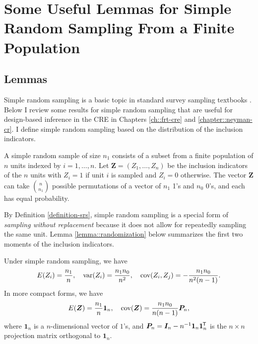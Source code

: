 
\chapter{Some Useful Lemmas for Simple Random Sampling From a Finite Population}
 \label{chapter::SRS-appendix}

\section{Lemmas}
 
Simple random sampling is a basic topic in standard survey sampling textbooks \citep[e.g.,][]{cochran1953}. Below I review some results for simple random sampling that are useful for design-based inference in the CRE in Chapters \ref{ch::frt-cre} and \ref{chapter::neyman-cr}. I define simple random sampling based on the distribution of the inclusion indicators. 


\begin{definition}
\label{definition-srs}
A simple random sample of size $n_1$ consists of a subset from a finite population of $n$ units indexed by $i=1,\ldots, n$. 
Let $\bm{Z} = (Z_1, \ldots, Z_n)$ be the inclusion indicators of the $n$ units with $Z_i=1$ if unit $i$ is sampled and $Z_i=0$ otherwise.
The vector $\bm{Z}$ can take $\binom{n}{n_1}$ possible permutations of a vector of $n_1$ 1's and $n_0$ 0's, and each has equal probability.
\end{definition}

By Definition \ref{definition-srs}, simple random sampling is a special form of {\it sampling without replacement} because it does not allow for repeatedly sampling the same unit. Lemma \ref{lemma::randomization} below summarizes the first two moments of the inclusion indicators. 

 

\begin{lemma}
\label{lemma::randomization}
Under simple random sampling, we have 
$$
E ( Z_i )  = \frac{n_1}{ n}, \quad 
\textup{var}(Z_i) = \frac{  n_1 n_0 }{n^2}, \quad 
\textup{cov}(Z_i, Z_j) = - \frac{n_1 n_0 } { n^2 (n-1)  }.
$$ 
In more compact forms, we have 
$$
E(\bm{Z}) = \frac{n_1}{n} \bm{1}_n,\quad
\textup{cov}(\bm{Z}) = \frac{n_1n_0}{n(n-1)} \bm{P}_n,
$$
where $ \bm{1}_n$ is a $n$-dimensional vector of $1$'s, and $\bm{P}_n = \bm{I}_n  - n^{-1} \bm{1}_n \bm{1}_n^{\mkern-1.5mu\mathsf{T}} $ is the $n\times n$ projection matrix orthogonal to $ \bm{1}_n.$
\end{lemma}




